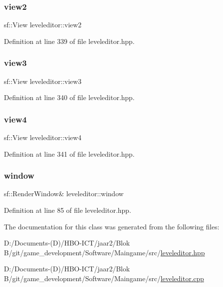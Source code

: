 \subsubsection{\texorpdfstring{view2}{view2}}
{\footnotesize\ttfamily sf\+::\+View leveleditor\+::view2}



Definition at line 339 of file leveleditor.\+hpp.

\mbox{\label{classleveleditor_a2051eecaa725f921ef9520030c713a0b}} 
\subsubsection{\texorpdfstring{view3}{view3}}
{\footnotesize\ttfamily sf\+::\+View leveleditor\+::view3}



Definition at line 340 of file leveleditor.\+hpp.

\mbox{\label{classleveleditor_a73061ee47d22e443922a460cb97d2ed3}} 
\subsubsection{\texorpdfstring{view4}{view4}}
{\footnotesize\ttfamily sf\+::\+View leveleditor\+::view4}



Definition at line 341 of file leveleditor.\+hpp.

\mbox{\label{classleveleditor_a95edfc93a38089da61375eef9e65606e}} 
\subsubsection{\texorpdfstring{window}{window}}
{\footnotesize\ttfamily sf\+::\+Render\+Window\& leveleditor\+::window\hspace{0.3cm}{\ttfamily [private]}}



Definition at line 85 of file leveleditor.\+hpp.



The documentation for this class was generated from the following files\+:\begin{DoxyCompactItemize}
\item 
D\+:/\+Documents-\/(\+D)/\+H\+B\+O-\/\+I\+C\+T/jaar2/\+Blok B/git/game\+\_\+development/\+Software/\+Maingame/src/\hyperlink{leveleditor_8hpp}{leveleditor.\+hpp}\item 
D\+:/\+Documents-\/(\+D)/\+H\+B\+O-\/\+I\+C\+T/jaar2/\+Blok B/git/game\+\_\+development/\+Software/\+Maingame/src/\hyperlink{leveleditor_8cpp}{leveleditor.\+cpp}\end{DoxyCompactItemize}
